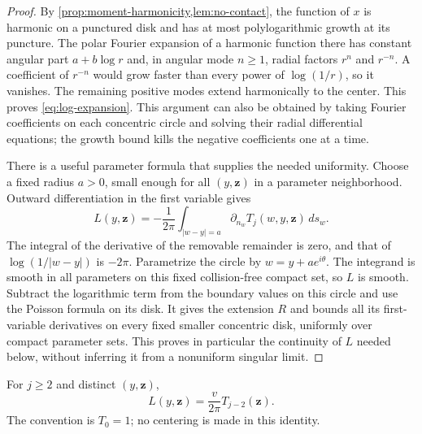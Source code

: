 \begin{proof}
By \cref{prop:moment-harmonicity,lem:no-contact}, the function of $x$
is harmonic on a punctured disk and has at most polylogarithmic
growth at its puncture. The polar Fourier expansion of a harmonic
function there has constant angular part $a+b\log r$ and, in angular
mode $n\ge1$, radial factors $r^n$ and $r^{-n}$. A coefficient of
$r^{-n}$ would grow faster than every power of $\log(1/r)$, so it
vanishes. The remaining positive modes extend harmonically to the
center. This proves \eqref{eq:log-expansion}. This argument can
also be obtained by taking Fourier coefficients on each concentric
circle and solving their radial differential equations; the growth
bound kills the negative coefficients one at a time.

There is a useful parameter formula that supplies the needed
uniformity. Choose a fixed radius $a>0$, small enough for all
$(y,\mathbf z)$ in a parameter neighborhood. Outward differentiation
in the first variable gives
\begin{equation}
 L(y,\mathbf z)
   =-\frac1{2\pi}\int_{|w-y|=a}
                      \partial_{n_w}T_j(w,y,\mathbf z)\,ds_w.
 \label{eq:circle-log-coefficient}
\end{equation}
The integral of the derivative of the removable remainder is zero,
and that of $\log(1/|w-y|)$ is $-2\pi$. Parametrize the circle by
$w=y+a e^{i\theta}$. The integrand is smooth in all parameters on
this fixed collision-free compact set, so $L$ is smooth. Subtract
the logarithmic term from the boundary values on this circle and
use the Poisson formula on its disk. It gives the extension $R$
and bounds all its first-variable derivatives on every fixed
smaller concentric disk, uniformly over compact parameter sets.
This proves in particular the continuity of $L$ needed below,
without inferring it from a nonuniform singular limit.
\end{proof}

\begin{proposition}
\label{prop:collision-coefficient}
For $j\ge2$ and distinct $(y,\mathbf z)$,
\begin{equation}
                  L(y,\mathbf z)=\frac{v}{2\pi}T_{j-2}(\mathbf z).
 \label{eq:collision-coefficient}
\end{equation}
The convention is $T_0=1$; no centering is made in this identity.
\end{proposition}

